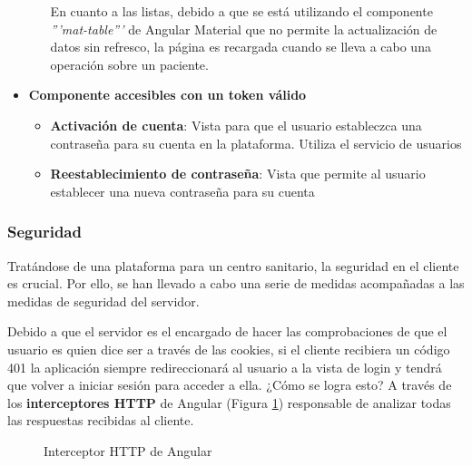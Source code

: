 \begin{itemize}
\begin{itemize}
        En cuanto a las listas, debido a que se está utilizando el componente \textit{'''mat-table'''} de Angular Material que no permite la actualización de datos sin refresco, la página es recargada cuando se lleva a cabo una operación sobre un paciente. 
    \end{itemize}
    \item \textbf{Componente accesibles con un token válido}
    \begin{itemize}
        \item \textbf{Activación de cuenta}: Vista para que el usuario estableczca una contraseña para su cuenta en la plataforma. Utiliza el servicio de usuarios
        \item \textbf{Reestablecimiento de contraseña}: Vista que permite al usuario establecer una nueva contraseña para su cuenta
    \end{itemize}
\end{itemize}

\subsubsection*{Seguridad}
Tratándose de una plataforma para un centro sanitario, la seguridad en el cliente es crucial. Por ello, se han llevado a cabo una serie de medidas acompañadas a las medidas de seguridad del servidor. \bigskip

Debido a que el servidor es el encargado de hacer las comprobaciones de que el usuario es quien dice ser a través de las cookies, si el cliente recibiera un código 401 la aplicación siempre redireccionará al usuario a la vista de login y tendrá que volver a iniciar sesión para acceder a ella. ¿Cómo se logra esto? A través de los \textbf{interceptores HTTP} de Angular (Figura \ref{fig:interceptor}) responsable de analizar todas las respuestas recibidas al cliente.

\begin{figure}[H]
    \caption{Interceptor HTTP de Angular}
    \label{fig:interceptor}
\end{figure}

